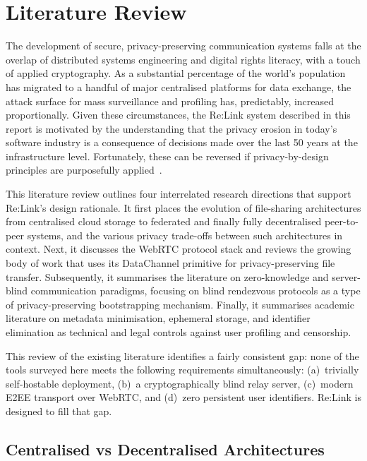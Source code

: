 \documentclass[12pt,a4paper,oneside]{report}
\begin{document}
\chapter{Literature Review}
\label{ch:lit-review}

The development of secure, privacy-preserving communication systems falls at the overlap of distributed systems engineering and digital rights literacy, with a touch of applied cryptography. As a substantial percentage of the world's population has migrated to a handful of major centralised platforms for data exchange, the attack surface for mass surveillance and profiling has, predictably, increased proportionally. Given these circumstances, the Re:Link system described in this report is motivated by the understanding that the privacy erosion in today's software industry is a consequence of decisions made over the last 50 years at the infrastructure level. Fortunately, these can be reversed if privacy-by-design principles are purposefully applied~\cite{cavoukian2011}.

This literature review outlines four interrelated research directions that support Re:Link's design rationale. It first places the evolution of file-sharing architectures from centralised cloud storage to federated and finally fully decentralised peer-to-peer systems, and the various privacy trade-offs between such architectures in context. Next, it discusses the WebRTC protocol stack and reviews the growing body of work that uses its DataChannel primitive for privacy-preserving file transfer. Subsequently, it summarises the literature on zero-knowledge and server-blind communication paradigms, focusing on blind rendezvous protocols as a type of privacy-preserving bootstrapping mechanism. Finally, it summarises academic literature on metadata minimisation, ephemeral storage, and identifier elimination as technical and legal controls against user profiling and censorship.

This review of the existing literature identifies a fairly consistent gap: none of the tools surveyed here meets the following requirements simultaneously: (a)~trivially self-hostable deployment, (b)~a cryptographically blind relay server, (c)~modern E2EE transport over WebRTC, and (d)~zero persistent user identifiers. Re:Link is designed to fill that gap.


\section{Centralised vs Decentralised Architectures}
\label{sec:centralised-vs-decentralised}
\end{document}

